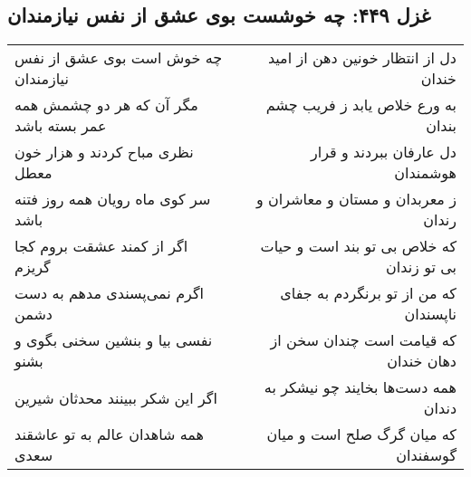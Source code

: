 \begin{center}
\section*{غزل ۴۴۹: چه خوشست بوی عشق از نفس نیازمندان}
\label{sec:449}
\begin{longtable}{l p{0.5cm} r}
چه خوش است بوی عشق از نفس نیازمندان
&&
دل از انتظار خونین دهن از امید خندان
\\
مگر آن که هر دو چشمش همه عمر بسته باشد
&&
به ورع خلاص یابد ز فریب چشم بندان
\\
نظری مباح کردند و هزار خون معطل
&&
دل عارفان ببردند و قرار هوشمندان
\\
سر کوی ماه رویان همه روز فتنه باشد
&&
ز معربدان و مستان و معاشران و رندان
\\
اگر از کمند عشقت بروم کجا گریزم
&&
که خلاص بی تو بند است و حیات بی تو زندان
\\
اگرم نمی‌پسندی مدهم به دست دشمن
&&
که من از تو برنگردم به جفای ناپسندان
\\
نفسی بیا و بنشین سخنی بگوی و بشنو
&&
که قیامت است چندان سخن از دهان خندان
\\
اگر این شکر ببینند محدثان شیرین
&&
همه دست‌ها بخایند چو نیشکر به دندان
\\
همه شاهدان عالم به تو عاشقند سعدی
&&
که میان گرگ صلح است و میان گوسفندان
\\
\end{longtable}
\end{center}
